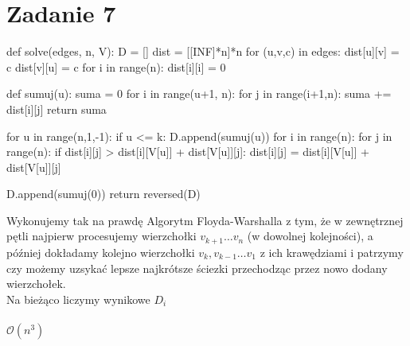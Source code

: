 \documentclass{article}
\begin{document}
\section{Zadanie 7}
\begin{python}
def solve(edges, n, V):
    D = []
    dist = [[INF]*n]*n
    for (u,v,c) in edges:
        dist[u][v] = c
        dist[v][u] = c
    for i in range(n):
        dist[i][i] = 0

    def sumuj(u):
        suma = 0
        for i in range(u+1, n):
            for j in range(i+1,n):
                suma += dist[i][j]
        return suma

    for u in range(n,1,-1):
        if u <= k:
            D.append(sumuj(u))
        for i in range(n):
            for j in range(n):
                if dist[i][j] > dist[i][V[u]] + dist[V[u]][j]:
                    dist[i][j] = dist[i][V[u]] + dist[V[u]][j]

    D.append(sumuj(0))
    return reversed(D)
\end{python}
Wykonujemy tak na prawdę Algorytm Floyda-Warshalla z tym, że w zewnętrznej pętli najpierw procesujemy wierzchołki $v_{k+1} \ldots v_n$ (w dowolnej kolejności), a później dokładamy kolejno wierzchołki $v_k, v_{k-1} \ldots v_1$ z ich krawędziami i patrzymy czy możemy uzsykać lepsze najkrótsze ściezki przechodząc przez nowo dodany wierzchołek.\\
Na bieżąco liczymy wynikowe $D_i$\\\\
$\mathcal{O}(n^3)$
\end{document}
